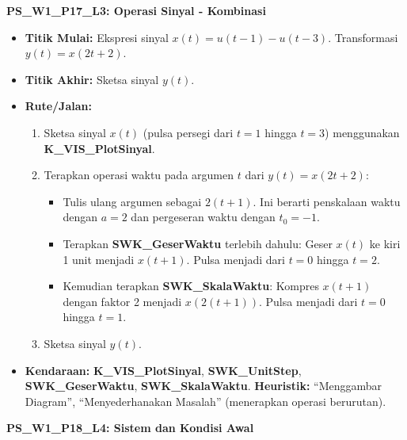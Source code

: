 \documentclass[
  letterpaper,
  DIV=11,
  numbers=noendperiod]{scrreprt}
\providecommand{\tightlist}{%
  \setlength{\itemsep}{0pt}\setlength{\parskip}{0pt}}
\begin{document}
\textbf{PS\_W1\_P17\_L3: Operasi Sinyal - Kombinasi}

\begin{itemize}
\tightlist
\item
  \textbf{Titik Mulai:} Ekspresi sinyal \(x(t) = u(t-1) - u(t-3)\).
  Transformasi \(y(t) = x(2t+2)\).
\item
  \textbf{Titik Akhir:} Sketsa sinyal \(y(t)\).
\item
  \textbf{Rute/Jalan:}

  \begin{enumerate}
  \def\labelenumi{\arabic{enumi}.}
  \tightlist
  \item
    Sketsa sinyal \(x(t)\) (pulsa persegi dari \(t=1\) hingga \(t=3\))
    menggunakan \textbf{K\_VIS\_PlotSinyal}.
  \item
    Terapkan operasi waktu pada argumen \(t\) dari \(y(t) = x(2t+2)\):

    \begin{itemize}
    \tightlist
    \item
      Tulis ulang argumen sebagai \(2(t+1)\). Ini berarti penskalaan
      waktu dengan \(a=2\) dan pergeseran waktu dengan \(t_0=-1\).
    \item
      Terapkan \textbf{SWK\_GeserWaktu} terlebih dahulu: Geser \(x(t)\)
      ke kiri 1 unit menjadi \(x(t+1)\). Pulsa menjadi dari \(t=0\)
      hingga \(t=2\).
    \item
      Kemudian terapkan \textbf{SWK\_SkalaWaktu}: Kompres \(x(t+1)\)
      dengan faktor 2 menjadi \(x(2(t+1))\). Pulsa menjadi dari \(t=0\)
      hingga \(t=1\).
    \end{itemize}
  \item
    Sketsa sinyal \(y(t)\).
  \end{enumerate}
\item
  \textbf{Kendaraan:} \textbf{K\_VIS\_PlotSinyal},
  \textbf{SWK\_UnitStep}, \textbf{SWK\_GeserWaktu},
  \textbf{SWK\_SkalaWaktu}. \textbf{Heuristik:} ``Menggambar Diagram'',
  ``Menyederhanakan Masalah'' (menerapkan operasi berurutan).
\end{itemize}

\textbf{PS\_W1\_P18\_L4: Sistem dan Kondisi Awal}
\end{document}
